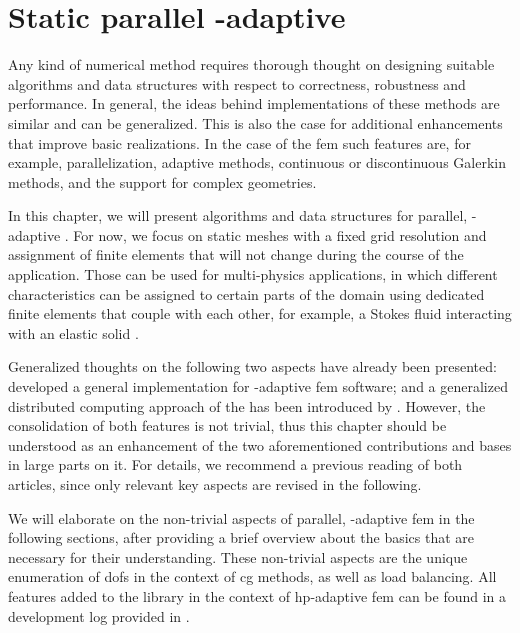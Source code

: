 \chapter{Static parallel \hp-adaptive }
\label{ch:parallel}
\glsresetall

Any kind of numerical method requires thorough thought on designing suitable algorithms and data structures with respect to correctness, robustness and performance. In general, the ideas behind implementations of these methods are similar and can be generalized.
This is also the case for additional enhancements that improve basic realizations. In the case of the \gls{fem} such features are, for example, parallelization, adaptive methods, continuous or discontinuous Galerkin methods, and the support for complex geometries.

In this chapter, we will present algorithms and data structures for parallel, \hp-adaptive . For now, we focus on static meshes with a fixed grid resolution and assignment of finite elements that will not change during the course of the application. Those can be used for multi-physics applications, in which different characteristics can be assigned to certain parts of the domain using dedicated finite elements that couple with each other, for example, a Stokes fluid interacting with an elastic solid \textcite{dealiistep-46}.

Generalized thoughts on the following two aspects have already been presented: \textcite{bangerth2009} developed a general implementation for \hp-adaptive \gls{fem} software; and a generalized distributed computing approach of the  has been introduced by \textcite{bangerth2012}. However, the consolidation of both features is not trivial, thus this chapter should be understood as an enhancement of the two aforementioned contributions and bases in large parts on it. For details, we recommend a previous reading of both articles, since only relevant key aspects are revised in the following.

We will elaborate on the non-trivial aspects of parallel, \hp-adaptive \gls{fem} in the following sections, after providing a brief overview about the basics that are necessary for their understanding. These non-trivial aspects are the unique enumeration of \glspl{dof} in the context of \gls{cg} methods, as well as load balancing. All features added to the \dealii{} library in the context of hp-adaptive \gls{fem} can be found in a development log provided in \textcite{dealiiissue3511}.





